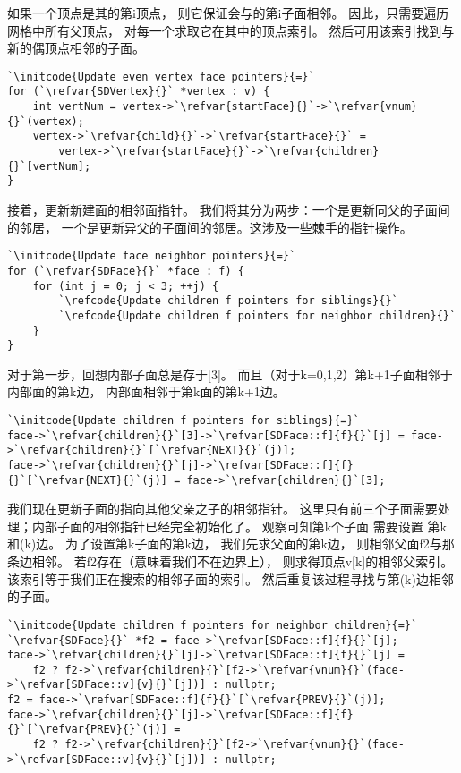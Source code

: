 如果一个顶点是其的第{\ttfamily i}顶点，
则它保证会与的第{\ttfamily i}子面相邻。
因此，只需要遍历网格中所有父顶点，
对每一个求取它在其中的顶点索引。
然后可用该索引找到与新的偶顶点相邻的子面。
\begin{lstlisting}
`\initcode{Update even vertex face pointers}{=}`
for (`\refvar{SDVertex}{}` *vertex : v) {
    int vertNum = vertex->`\refvar{startFace}{}`->`\refvar{vnum}{}`(vertex);
    vertex->`\refvar{child}{}`->`\refvar{startFace}{}` = 
        vertex->`\refvar{startFace}{}`->`\refvar{children}{}`[vertNum];
}
\end{lstlisting}

接着，更新新建面的相邻面指针。
我们将其分为两步：一个是更新同父的子面间的邻居，
一个是更新异父的子面间的邻居。这涉及一些棘手的指针操作。
\begin{lstlisting}
`\initcode{Update face neighbor pointers}{=}`
for (`\refvar{SDFace}{}` *face : f) {
    for (int j = 0; j < 3; ++j) {
        `\refcode{Update children f pointers for siblings}{}`
        `\refcode{Update children f pointers for neighbor children}{}`
    }
}
\end{lstlisting}

对于第一步，回想内部子面总是存于{\ttfamily{}[3]}。
而且（对于{\ttfamily k}=0,1,2）第{\ttfamily k+1}子面相邻于内部面的第{\ttfamily k}边，
内部面相邻于第{\ttfamily k}面的第{\ttfamily k+1}边。
\begin{lstlisting}
`\initcode{Update children f pointers for siblings}{=}`
face->`\refvar{children}{}`[3]->`\refvar[SDFace::f]{f}{}`[j] = face->`\refvar{children}{}`[`\refvar{NEXT}{}`(j)];
face->`\refvar{children}{}`[j]->`\refvar[SDFace::f]{f}{}`[`\refvar{NEXT}{}`(j)] = face->`\refvar{children}{}`[3];
\end{lstlisting}

我们现在更新子面的指向其他父亲之子的相邻指针。
这里只有前三个子面需要处理；内部子面的相邻指针已经完全初始化了。
观察可知第{\ttfamily k}个子面
需要设置
第{\ttfamily k}和{\ttfamily{}(k)}边。
为了设置第{\ttfamily k}子面的第{\ttfamily k}边，
我们先求父面的第{\ttfamily k}边，
则相邻父面{\ttfamily f2}与那条边相邻。
若{\ttfamily f2}存在（意味着我们不在边界上），
则求得顶点{\ttfamily v[k]}的相邻父索引。
该索引等于我们正在搜索的相邻子面的索引。
然后重复该过程寻找与第{\ttfamily{}(k)}边相邻的子面。
\begin{lstlisting}
`\initcode{Update children f pointers for neighbor children}{=}`
`\refvar{SDFace}{}` *f2 = face->`\refvar[SDFace::f]{f}{}`[j];
face->`\refvar{children}{}`[j]->`\refvar[SDFace::f]{f}{}`[j] =
    f2 ? f2->`\refvar{children}{}`[f2->`\refvar{vnum}{}`(face->`\refvar[SDFace::v]{v}{}`[j])] : nullptr;
f2 = face->`\refvar[SDFace::f]{f}{}`[`\refvar{PREV}{}`(j)];
face->`\refvar{children}{}`[j]->`\refvar[SDFace::f]{f}{}`[`\refvar{PREV}{}`(j)] = 
    f2 ? f2->`\refvar{children}{}`[f2->`\refvar{vnum}{}`(face->`\refvar[SDFace::v]{v}{}`[j])] : nullptr;
\end{lstlisting}

